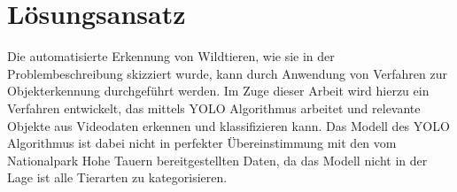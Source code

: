 \section{Lösungsansatz}
Die automatisierte Erkennung von Wildtieren, wie sie in der Problembeschreibung skizziert wurde, kann durch Anwendung von Verfahren zur Objekterkennung durchgeführt werden. Im Zuge dieser Arbeit wird hierzu ein Verfahren entwickelt, das mittels YOLO Algorithmus arbeitet und relevante Objekte aus Videodaten erkennen und klassifizieren kann. Das Modell des YOLO Algorithmus ist dabei nicht in perfekter Übereinstimmung mit den vom Nationalpark Hohe Tauern bereitgestellten Daten, da das Modell nicht in der Lage ist alle Tierarten zu kategorisieren.
